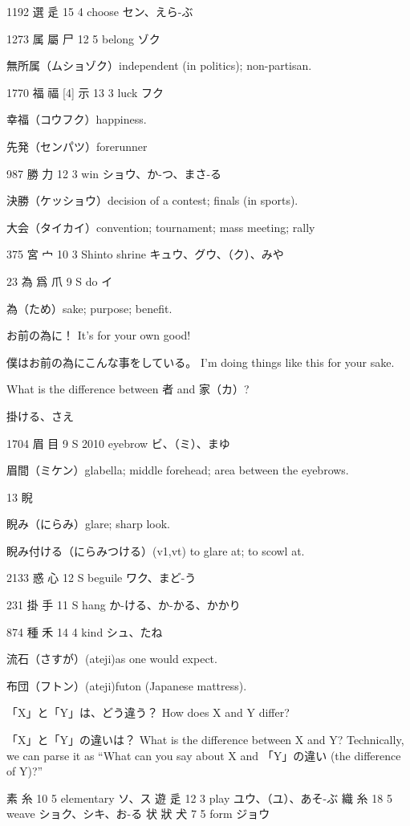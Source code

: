 1192	選		辵	15	4		choose	セン、えら-ぶ

1273	属	屬	尸	12	5		belong	ゾク

無所属（ムショゾク）independent (in politics); non-partisan.

1770	福	福 [4]	示	13	3		luck	フク

幸福（コウフク）happiness.

先発（センパツ）forerunner

987	勝		力	12	3		win	ショウ、か-つ、まさ-る

決勝（ケッショウ）decision of a contest; finals (in sports).

大会（タイカイ）convention; tournament; mass meeting; rally

375	宮		宀	10	3		Shinto shrine	キュウ、グウ、（ク）、みや

23	為	爲	爪	9	S		do	イ

為（ため）sake; purpose; benefit.

お前の為に！
It's for your own good!

僕はお前の為にこんな事をしている。
I'm doing things like this for your sake.

What is the difference between 者 and 家（カ）?

掛ける、さえ

1704	眉		目	9	S	2010	eyebrow	ビ、（ミ）、まゆ

眉間（ミケン）glabella; middle forehead; area between the eyebrows.

13 睨

睨み（にらみ）glare; sharp look.

睨み付ける（にらみつける）(v1,vt) to glare at; to scowl at.

2133	惑		心	12	S		beguile	ワク、まど-う

231	掛		手	11	S		hang	か-ける、か-かる、かかり

874	種		禾	14	4		kind	シュ、たね

流石（さすが）(ateji)as one would expect.

布団（フトン）(ateji)futon (Japanese mattress).

「X」と「Y」は、どう違う？
How does X and Y differ?

「X」と「Y」の違いは？
What is the difference between X and Y?
Technically, we can parse it as
``What can you say about X and 「Y」の違い (the difference of Y)?''

素  糸 10 5  elementary ソ、ス
遊  辵 12 3  play ユウ、（ユ）、あそ-ぶ
織  糸 18 5  weave ショク、シキ、お-る
状 狀 犬 7 5  form ジョウ

